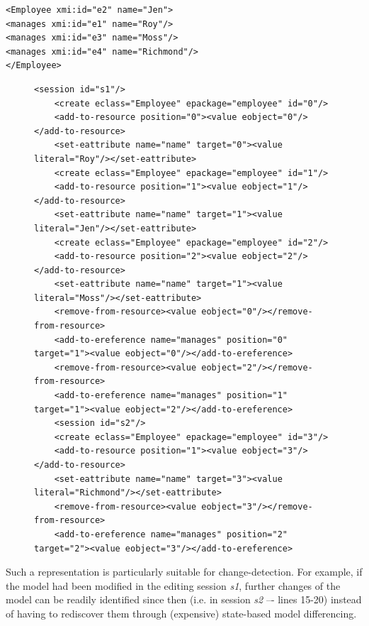 \documentclass[12pt, a4paper]{report} \usepackage[titletoc]{appendix}
\begin{document}
\begin{lstlisting}[style=xmi,caption={State-based representation of the model of Figure \ref{fig:modified_chart} in (simplified) XMI.},label=lst:xmimodel_0]
<Employee xmi:id="e2" name="Jen">
<manages xmi:id="e1" name="Roy"/>
<manages xmi:id="e3" name="Moss"/>
<manages xmi:id="e4" name="Richmond"/>
</Employee>
\end{lstlisting}

\begin{figure}[h]
	\begin{lstlisting}[style=xml,caption={Change-based representation of the model of Figure \ref{fig:modified_chart}.},label=lst:change-based persistencemodel_0]
	<session id="s1"/>
	<create eclass="Employee" epackage="employee" id="0"/>
	<add-to-resource position="0"><value eobject="0"/></add-to-resource>
	<set-eattribute name="name" target="0"><value literal="Roy"/></set-eattribute>
	<create eclass="Employee" epackage="employee" id="1"/>
	<add-to-resource position="1"><value eobject="1"/></add-to-resource>
	<set-eattribute name="name" target="1"><value literal="Jen"/></set-eattribute>
	<create eclass="Employee" epackage="employee" id="2"/>
	<add-to-resource position="2"><value eobject="2"/></add-to-resource>
	<set-eattribute name="name" target="1"><value literal="Moss"/></set-eattribute>
	<remove-from-resource><value eobject="0"/></remove-from-resource>
	<add-to-ereference name="manages" position="0" target="1"><value eobject="0"/></add-to-ereference>
	<remove-from-resource><value eobject="2"/></remove-from-resource>
	<add-to-ereference name="manages" position="1" target="1"><value eobject="2"/></add-to-ereference>
	<session id="s2"/>
	<create eclass="Employee" epackage="employee" id="3"/>
	<add-to-resource position="1"><value eobject="3"/></add-to-resource>
	<set-eattribute name="name" target="3"><value literal="Richmond"/></set-eattribute>
	<remove-from-resource><value eobject="3"/></remove-from-resource>
	<add-to-ereference name="manages" position="2" target="2"><value eobject="3"/></add-to-ereference>
	\end{lstlisting}
\end{figure}

Such a representation is particularly suitable for change-detection. For example, if the model had been modified in the editing session \emph{s1}, further changes of the model can be readily identified since then (i.e. in session \emph{s2} –- lines 15-20) instead of having to rediscover them through (expensive) state-based model differencing.
\end{document}
